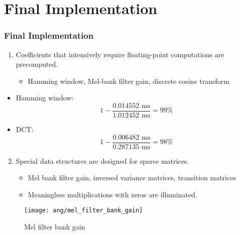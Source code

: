 \section{Final Implementation}


\begin{frame}
\frametitle{Final Implementation}

\begin{enumerate}
	\item Coefficients that intensively require floating-point computations are precomputed.
	\begin{itemize}
		\item Hamming window, Mel-bank filter gain, discrete cosine transform
	\end{itemize}
\end{enumerate}

\begin{itemize}
\item Hamming window:
\begin{equation}
1 - \frac{0.014552 \text{ ms}}{1.012452 \text{ ms}} = 99\%
\end{equation}
\item DCT:
\begin{equation}
1 - \frac{0.006482 \text{ ms}}{0.287135 \text{ ms}} = 98\%
\end{equation}
\end{itemize}
\end{frame}

\begin{frame}
\begin{enumerate}
	\setcounter{enumi}{1}
	\item Special data structures are designed for sparse matrices.
	\begin{itemize}
		\item Mel bank filter gain, inversed variance matrices, transition matrices
		\item Meaningless multiplications with zeros are illuminated.
	\end{itemize}
\end{enumerate}

\begin{figure}[H]
\centering
\texttt{[image: ang/mel\_filter\_bank\_gain]}
\caption{Mel filter bank gain}
\end{figure}
\end{frame}

